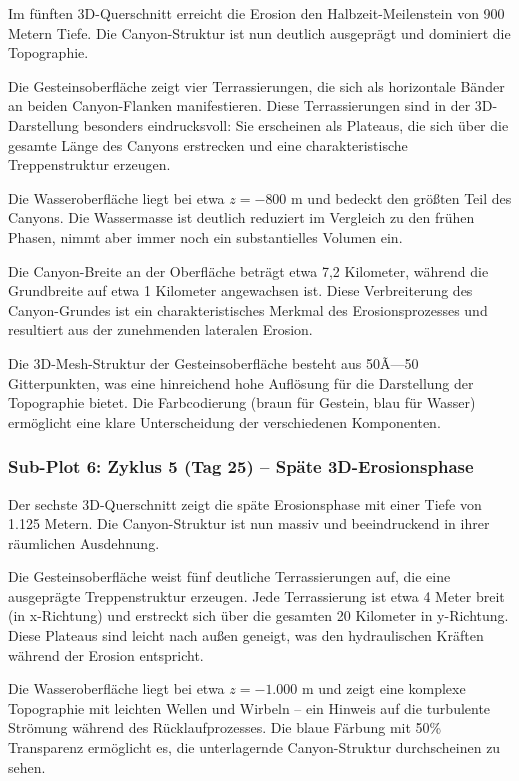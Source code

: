 Im fünften 3D-Querschnitt erreicht die Erosion den Halbzeit-Meilenstein von 900 Metern Tiefe. Die Canyon-Struktur ist nun deutlich ausgeprägt und dominiert die Topographie.

Die Gesteinsoberfläche zeigt vier Terrassierungen, die sich als horizontale Bänder an beiden Canyon-Flanken manifestieren. Diese Terrassierungen sind in der 3D-Darstellung besonders eindrucksvoll: Sie erscheinen als Plateaus, die sich über die gesamte Länge des Canyons erstrecken und eine charakteristische Treppenstruktur erzeugen.

Die Wasseroberfläche liegt bei etwa $z = -800$ m und bedeckt den größten Teil des Canyons. Die Wassermasse ist deutlich reduziert im Vergleich zu den frühen Phasen, nimmt aber immer noch ein substantielles Volumen ein.

Die Canyon-Breite an der Oberfläche beträgt etwa 7,2 Kilometer, während die Grundbreite auf etwa 1 Kilometer angewachsen ist. Diese Verbreiterung des Canyon-Grundes ist ein charakteristisches Merkmal des Erosionsprozesses und resultiert aus der zunehmenden lateralen Erosion.

Die 3D-Mesh-Struktur der Gesteinsoberfläche besteht aus 50Ã—50 Gitterpunkten, was eine hinreichend hohe Auflösung für die Darstellung der Topographie bietet. Die Farbcodierung (braun für Gestein, blau für Wasser) ermöglicht eine klare Unterscheidung der verschiedenen Komponenten.

\subsubsection*{Sub-Plot 6: Zyklus 5 (Tag 25) -- Späte 3D-Erosionsphase}

Der sechste 3D-Querschnitt zeigt die späte Erosionsphase mit einer Tiefe von 1.125 Metern. Die Canyon-Struktur ist nun massiv und beeindruckend in ihrer räumlichen Ausdehnung.

Die Gesteinsoberfläche weist fünf deutliche Terrassierungen auf, die eine ausgeprägte Treppenstruktur erzeugen. Jede Terrassierung ist etwa 4 Meter breit (in x-Richtung) und erstreckt sich über die gesamten 20 Kilometer in y-Richtung. Diese Plateaus sind leicht nach außen geneigt, was den hydraulischen Kräften während der Erosion entspricht.

Die Wasseroberfläche liegt bei etwa $z = -1.000$ m und zeigt eine komplexe Topographie mit leichten Wellen und Wirbeln -- ein Hinweis auf die turbulente Strömung während des Rücklaufprozesses. Die blaue Färbung mit 50\% Transparenz ermöglicht es, die unterlagernde Canyon-Struktur durchscheinen zu sehen.

